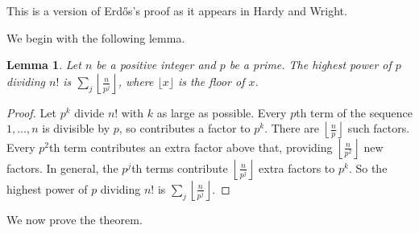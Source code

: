 \documentclass[12pt]{article}
\newtheorem*{lemma*}{Lemma}
\begin{document}

This is a version of Erd\H{o}s's proof as it appears in Hardy and Wright.

We begin with the following lemma.

\begin{lemma*}
Let $n$ be a positive integer and $p$ be a prime.  The highest power of $p$ dividing $n!$ is $\displaystyle\sum_j\left\lfloor\frac{n}{p^j}\right\rfloor$, where $\lfloor x\rfloor$ is the floor of $x$.
\end{lemma*}

\begin{proof}
Let $p^k$ divide $n!$ with $k$ as large as possible.  Every $p$th term of the sequence $1,\dots,n$ is divisible by $p$, so contributes a factor to $p^k$.  There are $\displaystyle\left\lfloor\frac{n}{p}\right\rfloor$ such factors.  Every $p^2$th term contributes an extra factor above that, providing $\displaystyle\left\lfloor\frac{n}{p^2}\right\rfloor$ new factors.  In general, the $p^j$th terms contribute $\displaystyle\left\lfloor\frac{n}{p^j}\right\rfloor$ extra factors to $p^k$.  So the highest power of $p$ dividing $n!$ is $\displaystyle\sum_j\left\lfloor\frac{n}{p^j}\right\rfloor$.
\end{proof}

We now prove the theorem.
\end{document}
